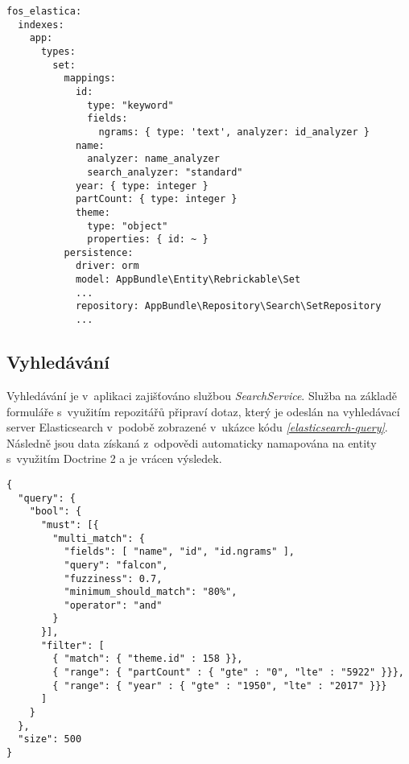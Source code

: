 \begin{listing}[htbp]
  \begin{verbatim}
fos_elastica:
  indexes:
    app:
      types:
        set:
          mappings:
            id:
              type: "keyword"
              fields:
                ngrams: { type: 'text', analyzer: id_analyzer }
            name: 
              analyzer: name_analyzer 
              search_analyzer: "standard"
            year: { type: integer }
            partCount: { type: integer }
            theme:
              type: "object"
              properties: { id: ~ }
          persistence:
            driver: orm
            model: AppBundle\Entity\Rebrickable\Set
            ...
            repository: AppBundle\Repository\Search\SetRepository
            ...
  \end{verbatim}
  \caption{Ukázka nastavení mapování entity \textit{Set} \label{elasticsearch-set-index}}
\end{listing}

\subsection{Vyhledávání}
Vyhledávání je v~aplikaci zajišťováno službou \textit{SearchService}. Služba na základě formuláře s~využitím repozitářů připraví dotaz, který je odeslán na vyhledávací server Elasticsearch v~podobě zobrazené v~ukázce kódu \emph{\ref{elasticsearch-query}}. Následně jsou data získaná z~odpovědi automaticky namapována na entity s~využitím Doctrine 2 a je vrácen výsledek.

\begin{listing}[htbp]
  \begin{verbatim}
{
  "query": {
    "bool": { 
      "must": [{
        "multi_match": {
          "fields": [ "name", "id", "id.ngrams" ],
          "query": "falcon", 
          "fuzziness": 0.7,
          "minimum_should_match": "80%",
          "operator": "and"
        }
      }],
      "filter": [
        { "match": { "theme.id" : 158 }},
        { "range": { "partCount" : { "gte" : "0", "lte" : "5922" }}},
        { "range": { "year" : { "gte" : "1950", "lte" : "2017" }}}
      ]
    }
  },
  "size": 500
}
        \end{verbatim}
  \caption{Ukázka JSON dotazu Elasticsearch\label{elasticsearch-query}}
\end{listing}

